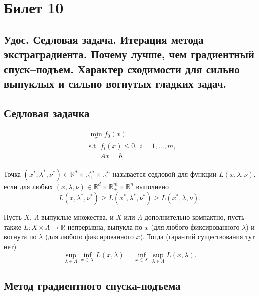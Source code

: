 \section{Билет 10}

\subsection{Удос. Седловая задача. Итерация метода экстраградиента. Почему лучше, чем градиентный спуск–подъем. Характер сходимости
    для сильно выпуклых и сильно вогнутых гладких задач.}

\subsection*{Седловая задачка}

\begin{equation}
    \begin{aligned}
         & \min_{x} f_0(x)                                 \\
         & \text{s.t. } f_i(x) \leq 0, \; i = 1, \dots, m, \\
         & \phantom{\text{s.t. }} Ax = b,
    \end{aligned}
    \label{eq:horse}
\end{equation}

\begin{definition}
    Точка $(x^*, \lambda^*, \nu^*) \in \mathbb{R}^d \times \mathbb{R}_+^m \times \mathbb{R}^n$ называется седловой
    для функции $L(x, \lambda, \nu)$, если для любых
    $(x, \lambda, \nu) \in \mathbb{R}^d \times \mathbb{R}_+^m \times \mathbb{R}^n$ выполнено
    $$L(x, \lambda^*, \nu^*) \geq L(x^*, \lambda^*, \nu^*) \geq L(x^*, \lambda, \nu).$$
\end{definition}

\begin{theorem}
    Пусть $X$, $\Lambda$ выпуклые множества, и $X$ или $\Lambda$ дополнительно компактно,
    пусть также $L : X \times \Lambda \to \mathbb{R}$ непрерывна, выпукла по $x$ (для любого фиксированного $\lambda$) и
    вогнута по $\lambda$ (для любого фиксированного $x$). Тогда (гарантий существования тут нет)
    $$\sup_{\lambda \in \Lambda} \inf_{x \in X} L(x, \lambda) = \inf_{x \in X} \sup_{\lambda \in \Lambda} L(x, \lambda).$$
\end{theorem}

\subsection*{Метод градиентного спуска-подъема}

